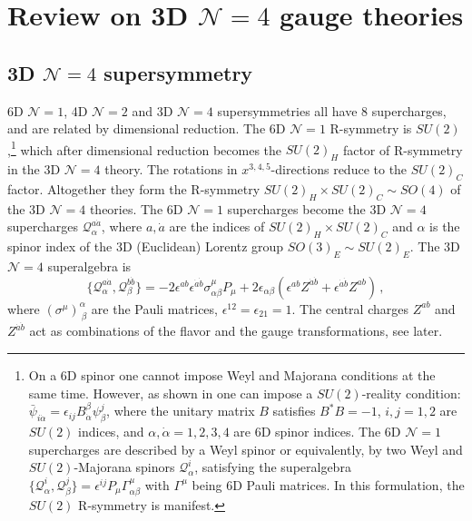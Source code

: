 \documentclass[12pt,a4paper]{article}
\renewcommand{\(}{\left(}
\renewcommand{\)}{\right)}
\renewcommand{\(}{\left(}
\renewcommand{\)}{\right)}
\begin{document}
\appendix

\section{\texorpdfstring{Review on 3D $\mathcal{N}=4$ gauge theories}{Review on 3D N=4 gauge theories}}
\label{appsec:Rev-3D-N=4}

\subsection{\texorpdfstring{3D $\mathcal{N}=4$ supersymmetry}{3D N=4 supersymmetry}}
\label{ssec:3D_N=4_SUSY}
	
6D $\mathcal{N}=1$, 4D $\mathcal{N}=2$ and 3D $\mathcal{N}=4$ supersymmetries all have 8 supercharges, and are related by dimensional reduction. 
The 6D $\mathcal{N}=1$ R-symmetry is $SU(2)$,\footnote{On a 6D spinor one cannot impose Weyl and Majorana conditions at the same time. 
However, as shown in \cite{Kugo:1982bn} one can impose a $SU(2)$-reality condition: $\bar{\psi}_{i\dot{\alpha}}=\epsilon_{ij}B_{\dot{\alpha}}^{\beta}\psi^j_{\beta}$, where the unitary matrix $B$ satisfies $B^*B=-1$, $i,j=1,2$ are $SU(2)$ indices, and $\alpha,\dot{\alpha}=1,2,3,4$ are 6D spinor indices. 
The 6D $\mathcal{N}=1$ supercharges are described by a Weyl spinor or equivalently, by two Weyl and $SU(2)$-Majorana spinors $\mathcal{Q}^i_\alpha$, satisfying the superalgebra $\{\mathcal{Q}^i_\alpha,\mathcal{Q}^j_\beta\}=\epsilon^{ij} P_\mu \Gamma^\mu_{\alpha\beta}$ with $\Gamma^\mu$ being 6D Pauli matrices. 
In this formulation, the $SU(2)$ R-symmetry is manifest.} which after dimensional reduction becomes the $SU(2)_H$ factor of R-symmetry in the 3D $\mathcal{N}=4$ theory. 
The rotations in $x^{3,4,5}$-directions reduce to the $SU(2)_C$ factor. 
Altogether they form the R-symmetry $SU(2)_{H}\times SU(2)_C\sim SO(4)$ of the 3D $\mathcal{N}=4$ theories. 
The 6D $\mathcal{N}=1$ supercharges become the 3D $\mathcal{N}=4$ supercharges $\mathcal{Q}^{a\dot{a}}_{\alpha}$, where $a,\dot{a}$ are the indices of $SU(2)_{H}\times SU(2)_C$ and $\alpha$ is the  spinor index of the 3D (Euclidean) Lorentz group $SO(3)_E\sim SU(2)_E$.
The 3D $\mathcal{N}=4$ superalgebra is 
\begin{equation}\label{eq:SUSY3DN4}
\{\mathcal{Q}_\alpha^{a\dot{a}},\mathcal{Q}_\beta^{b\dot{b}}\}
=-2\epsilon^{ab}\epsilon^{\dot{a}\dot{b}}\sigma^\mu_{\alpha\beta}P_\mu+2\epsilon_{\alpha\beta}(\epsilon^{ab}Z^{\dot{a}\dot{b}}+\epsilon^{\dot{a}\dot{b}}Z^{ab})\,,
\end{equation}
where $(\sigma^{\mu})^{\alpha}_{\ \beta}$ are the Pauli matrices, $\epsilon^{12}=\epsilon_{21}=1$.
The central charges $Z^{ab}$ and $Z^{\dot{a}\dot{b}}$ act as combinations of the flavor and the gauge transformations, see later.
\end{document}
